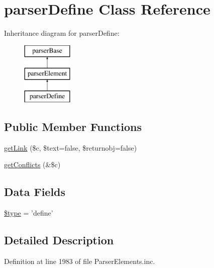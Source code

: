 \hypertarget{classparser_define}{\section{parser\-Define \-Class \-Reference}
\label{classparser_define}
}
\-Inheritance diagram for parser\-Define\-:\begin{figure}[H]
\begin{center}
\leavevmode
\includegraphics[height=3.000000cm]{classparser_define}
\end{center}
\end{figure}
\subsection*{\-Public \-Member \-Functions}
\begin{DoxyCompactItemize}
\item 
\hyperlink{classparser_define_a06461a82056b3b599f7011fdf0840877}{get\-Link} (\$c, \$text=false, \$returnobj=false)
\item 
\hyperlink{classparser_define_a3c0cda054b642b0209ddc1d36f1c061e}{get\-Conflicts} (\&\$c)
\end{DoxyCompactItemize}
\subsection*{\-Data \-Fields}
\begin{DoxyCompactItemize}
\item 
\hyperlink{classparser_define_a9a4a6fba2208984cabb3afacadf33919}{\$type} = 'define'
\end{DoxyCompactItemize}


\subsection{\-Detailed \-Description}


\-Definition at line 1983 of file \-Parser\-Elements.\-inc.



